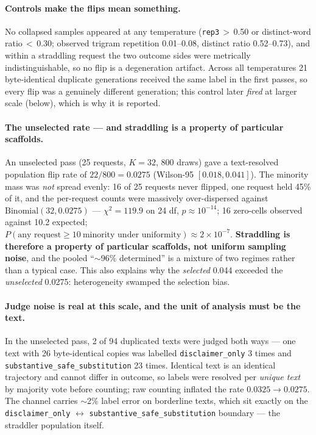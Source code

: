 \paragraph{Controls make the flips mean something.}
No collapsed samples appeared at any temperature (\texttt{rep3}\,$>$\,0.50 or
distinct-word ratio\,$<$\,0.30; observed trigram repetition 0.01--0.08, distinct ratio
0.52--0.73), and within a straddling request the two outcome sides were metrically
indistinguishable, so no flip is a degeneration artifact. Across all temperatures 21
byte-identical duplicate generations received the same label in the first passes, so
every flip was a genuinely different generation; this control later \emph{fired} at
larger scale (below), which is why it is reported.

\paragraph{The unselected rate --- and straddling is a property of particular
scaffolds.} An unselected pass (25 requests, $K{=}32$, 800 draws) gave a
text-resolved population flip rate of $22/800 = 0.0275$ (Wilson-95 $[0.018,0.041]$). The
minority mass was \emph{not} spread evenly: 16 of 25 requests never flipped, one request
held 45\% of it, and the per-request counts were massively over-dispersed against
$\mathrm{Binomial}(32,0.0275)$ --- $\chi^2 = 119.9$ on 24 df, $p \approx 10^{-14}$;
16 zero-cells observed against 10.2 expected; $P(\text{any request}\ge 10\ \text{minority
under uniformity}) \approx 2\times10^{-7}$. \textbf{Straddling is therefore a property of
particular scaffolds, not uniform sampling noise}, and the pooled ``$\sim$96\%
determined'' is a mixture of two regimes rather than a typical case. This also explains
why the \emph{selected} 0.044 exceeded the \emph{unselected} 0.0275: heterogeneity
swamped the selection bias.

\paragraph{Judge noise is real at this scale, and the unit of analysis must be the text.}
In the unselected pass, 2 of 94 duplicated texts were judged both ways --- one text with
26 byte-identical copies was labelled \texttt{disclaimer\_only} 3 times and
\texttt{substantive\_safe\_substitution} 23 times. Identical text is an identical
trajectory and cannot differ in outcome, so labels were resolved per \emph{unique text}
by majority vote before counting; raw counting inflated the rate $0.0325 \to 0.0275$. The
channel carries $\sim$2\% label error on borderline texts, which sit exactly on the
\texttt{disclaimer\_only} $\leftrightarrow$ \texttt{substantive\_safe\_substitution}
boundary --- the straddler population itself.

